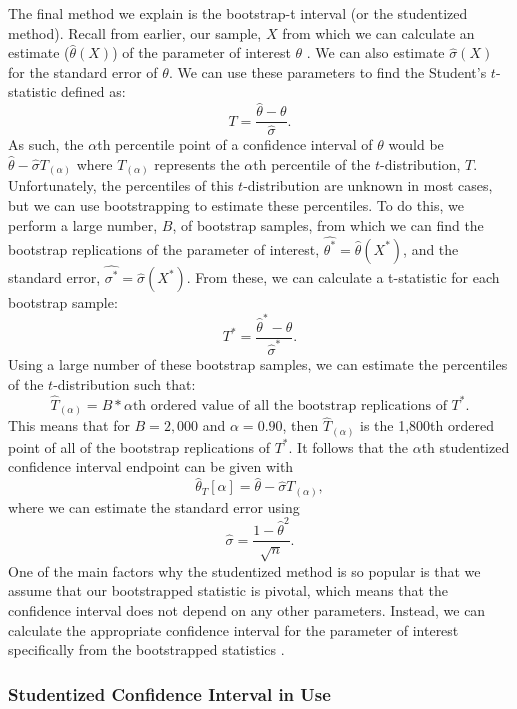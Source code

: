 \documentclass[12pt]{article}
\begin{document}
The final method we explain is the bootstrap-t interval (or the
studentized method). Recall from earlier, our sample, \(X\) from which
we can calculate an estimate (\(\hat{\theta}(X)\)) of the parameter of
interest \(\theta\) \citep[\citet{Puth15}]{Efron86}. We can also
estimate \(\hat{\sigma}(X)\) for the standard error of \(\theta\). We
can use these parameters to find the Student's \(t\)-statistic defined
as: \[T = \frac{\hat{\theta} - \theta}{\hat{\sigma}}.\] As such, the
\(\alpha\)th percentile point of a confidence interval of \(\theta\)
would be \(\hat{\theta} - \hat{\sigma}T_{(\alpha)}\) where
\(T_{(\alpha)}\) represents the \(\alpha\)th percentile of the
\(t\)-distribution, \(T\). Unfortunately, the percentiles of this
\(t\)-distribution are unknown in most cases, but we can use
bootstrapping to estimate these percentiles. To do this, we perform a
large number, \(B\), of bootstrap samples, from which we can find the
bootstrap replications of the parameter of interest,
\(\hat{\theta^*} = \hat{\theta}(X^*)\), and the standard error,
\(\hat{\sigma^*} = \hat{\sigma}(X^*)\). From these, we can calculate a
t-statistic for each bootstrap sample:
\[T^* = \frac{\hat{\theta}^* - \hat{\theta}}{\hat{\sigma}^*}.\] Using a
large number of these bootstrap samples, we can estimate the percentiles
of the \(t\)-distribution such that:
\[\hat{T}_{(\alpha)} = B*\alpha\text{th ordered value of all the bootstrap replications of }T^*.\]
This means that for \(B = 2,000\) and \(\alpha = 0.90\), then
\(\hat{T}_{(\alpha)}\) is the 1,800th ordered point of all of the
bootstrap replications of \(T^*\). It follows that the \(\alpha\)th
studentized confidence interval endpoint can be given with
\[\hat{\theta}_T[\alpha] = \hat{\theta} - \hat{\sigma}T_{(\alpha)},\]
where we can estimate the standard error using
\[\hat{\sigma} = \frac{1-\hat{\theta}^2}{\sqrt{n}}.\] One of the main
factors why the studentized method is so popular is that we assume that
our bootstrapped statistic is pivotal, which means that the confidence
interval does not depend on any other parameters. Instead, we can
calculate the appropriate confidence interval for the parameter of
interest specifically from the bootstrapped statistics
\citep[\citet{Puth15}]{Efron86}.

\hypertarget{studentized-confidence-interval-in-use}{%
\subsubsection{Studentized Confidence Interval in
Use}\label{studentized-confidence-interval-in-use}}
\end{document}
